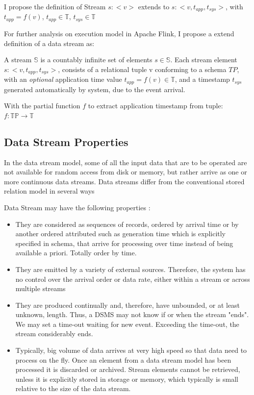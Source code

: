 I propose the definition of Stream $s:<v>$ extends to $s:<v, t_{app}, t_{sys}>$, with $t_{app} = f(v)$, $t_{app} \in \mathbb{T}$, $t_{sys} \in \mathbb{T}$

For further analysis on execution model in Apache Flink, I propose a extend definition of a data stream as:

\begin{defi}
	A stream $\mathbb{S}$ is a countably infinite set of elements $s \in \mathbb{S}$. Each  stream element $s: <v, t_{app}, t_{sys}>$, consists of a relational tuple v conforming to a schema $TP$, with an \textit{optional} application time value $t_{app} = f(v) \in \mathbb{T}$, and a timestamp $t_{sys}$ generated automatically by system, due to the event arrival.
\end{defi}
With the partial function $f$ to extract application timestamp from tuple: $f: \mathbb{TP} \rightarrow \mathbb{T}$


 
\subsection*{Data Stream Properties} 
In the data stream model, some of all the input data that are to be operated are not available for random access from disk or memory, but rather arrive as one or more continuous data streams. Data streams differ from the conventional stored relation model in several ways\citep{Babcock:2002}


Data Stream may have the following properties \citep{Golab:2010}:
\begin{itemize}
	\item They are considered as sequences of records, ordered by arrival time or by another ordered attributed such as generation time which is explicitly specified in schema, that arrive for processing over time instead of being available a priori. Totally order by time. 
	\item They are emitted by a variety of external sources. Therefore, the system has no control over the arrival order or data rate, either within a stream or across multiple streams
	\item They are produced continually and, therefore, have unbounded, or at least unknown, length. Thus, a DSMS may not know if or when the stream "ends". We may set a time-out waiting for new event. Exceeding the time-out, the stream considerably ends. 
	\item Typically, big volume of data arrives at very high speed so that data need to process on the fly. Once an element from a data stream model has been processed it is discarded or archived. Stream elements cannot be retrieved, unless it is explicitly stored in storage or memory, which typically is small relative to the size of the data stream. \citep{Babcock:2002}
	
\end{itemize}



